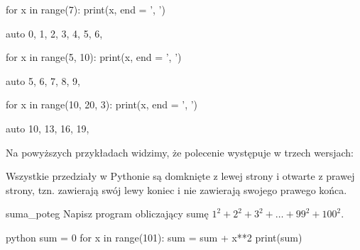 \documentclass{pdfBooklets}
\begin{document}
\begin{CodeFrame}[python]{0.5\textwidth}
for x in range(7):
    print(x, end = ', ')
\end{CodeFrame}
\begin{CodeFrame}{auto}
0, 1, 2, 3, 4, 5, 6, 
\end{CodeFrame}

\begin{CodeFrame}[python]{0.5\textwidth}
for x in range(5, 10):
    print(x, end = ', ')
\end{CodeFrame}
\begin{CodeFrame}{auto}
5, 6, 7, 8, 9, 
\end{CodeFrame}

\begin{CodeFrame}[python]{0.5\textwidth}
for x in range(10, 20, 3):
    print(x, end = ', ')
\end{CodeFrame}
\begin{CodeFrame}{auto}
10, 13, 16, 19, 
\end{CodeFrame}

\noindent Na powyższych przykładach widzimy, że polecenie  występuje w trzech wersjach:

\begin{ProTip}{}
\normalsize Wszystkie przedziały w Pythonie są domknięte z lewej strony i otwarte z prawej strony,
tzn. zawierają swój lewy koniec i nie zawierają swojego prawego końca.
\end{ProTip}

\begin{Zadanie}{}{suma_poteg}
Napisz program obliczający sumę $1^2 + 2^2 + 3^2 + \ldots + 99^2 + 100^2$. 

\begin{rozwiazanie}{python}
sum = 0
for x in range(101):
    sum = sum + x**2
print(sum)
\end{rozwiazanie}
\end{Zadanie}
\end{document}

